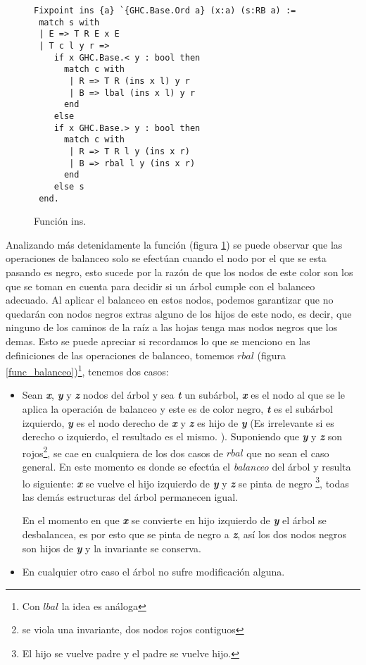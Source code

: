 \begin{figure}
\centering
\captionsetup{justification=centering}
\begin{verbatim}
Fixpoint ins {a} `{GHC.Base.Ord a} (x:a) (s:RB a) :=
 match s with
 | E => T R E x E
 | T c l y r =>
    if x GHC.Base.< y : bool then
      match c with
       | R => T R (ins x l) y r
       | B => lbal (ins x l) y r
      end
    else
    if x GHC.Base.> y : bool then
      match c with
       | R => T R l y (ins x r)
       | B => rbal l y (ins x r)
      end
    else s
 end.
\end{verbatim}
\caption{Funci\'on ins.}
\label{func_ins}
\end{figure}

Analizando m\'as detenidamente la funci\'on (figura \ref{func_ins}) se puede observar que las
operaciones de balanceo solo se efectúan cuando el nodo por el que se esta pasando es negro, esto
sucede por la raz\'on de que los nodos de este color son los que se toman en cuenta para decidir si
un \'arbol cumple con el balanceo adecuado. Al aplicar el balanceo en estos nodos, podemos 
garantizar que no quedar\'an con nodos negros extras alguno de los hijos de este nodo, es decir, que
ninguno de los caminos de la ra\'iz a las hojas tenga mas nodos negros que los demas. Esto se puede
apreciar si recordamos lo que se menciono en las definiciones de las operaciones de balanceo, tomemos $rbal$ (figura
\ref{func_balanceo})\footnote{Con $lbal$ la idea es an\'aloga}, tenemos dos casos:

\begin{itemize}
    \item Sean \textbf{\textit{x}}, \textbf{\textit{y}} y \textbf{\textit{z}} nodos del \'arbol y 
    sea \textbf{\textit{t}} un subárbol, \textbf{\textit{x}} es el nodo al que se le aplica la 
    operaci\'on de balanceo y este es de color negro, \textbf{\textit{t}} es el subárbol izquierdo,
    \textbf{\textit{y}} es el nodo derecho de \textbf{\textit{x}} y \textbf{\textit{z}} es hijo de
    \textbf{\textit{y}} (Es irrelevante si es derecho o izquierdo, el resultado es el mismo.
    ). Suponiendo que \textbf{\textit{y}} y \textbf{\textit{z}} son rojos\footnote{se viola una 
    invariante, dos nodos rojos contiguos}, se cae en cualquiera de los dos casos de $rbal$ que no 
    sean el caso general. En este momento es donde se efectúa el \textit{balanceo} del árbol y 
    resulta lo siguiente: \textbf{\textit{x}} se vuelve el hijo izquierdo de \textbf{\textit{y}} y
    \textbf{\textit{z}} se pinta de negro \footnote{El hijo se vuelve padre y el padre se vuelve 
    hijo.}, todas las dem\'as estructuras del \'arbol permanecen igual.

    En el momento en que \textbf{\textit{x}} se convierte en hijo izquierdo de \textbf{\textit{y}}
    el \'arbol se desbalancea, es por esto que se pinta de negro a \textbf{\textit{z}}, así los dos
    nodos negros son hijos de \textbf{\textit{y}} y la invariante se conserva.
    \item En cualquier otro caso el \'arbol no sufre modificaci\'on alguna.
\end{itemize}

